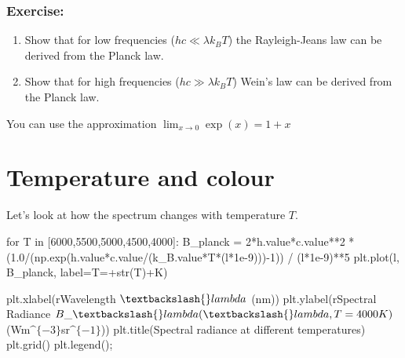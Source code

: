 \documentclass[
  letterpaper,
  DIV=11,
  numbers=noendperiod]{scrreprt}
\newenvironment{Shaded}{\begin{snugshade}}{\end{snugshade}}
\newcommand{\BuiltInTok}[1]{\textcolor[rgb]{0.00,0.23,0.31}{#1}}
\newcommand{\ControlFlowTok}[1]{\textcolor[rgb]{0.00,0.23,0.31}{#1}}
\newcommand{\DecValTok}[1]{\textcolor[rgb]{0.68,0.00,0.00}{#1}}
\newcommand{\FloatTok}[1]{\textcolor[rgb]{0.68,0.00,0.00}{#1}}
\newcommand{\KeywordTok}[1]{\textcolor[rgb]{0.00,0.23,0.31}{#1}}
\newcommand{\NormalTok}[1]{\textcolor[rgb]{0.00,0.23,0.31}{#1}}
\newcommand{\OperatorTok}[1]{\textcolor[rgb]{0.37,0.37,0.37}{#1}}
\newcommand{\StringTok}[1]{\textcolor[rgb]{0.13,0.47,0.30}{#1}}
\newcommand{\VerbatimStringTok}[1]{\textcolor[rgb]{0.13,0.47,0.30}{#1}}
\providecommand{\tightlist}{%
  \setlength{\itemsep}{0pt}\setlength{\parskip}{0pt}}\usepackage{longtable,booktabs,array}
\begin{document}
\hypertarget{exercise}{%
\subsection{Exercise:}\label{exercise}}

\begin{enumerate}
\def\labelenumi{\arabic{enumi}.}
\tightlist
\item
  Show that for low frequencies (\(hc \ll \lambda k_B T\)) the
  Rayleigh-Jeans law can be derived from the Planck law.
\item
  Show that for high frequencies (\(hc \gg \lambda k_B T\)) Wein's law
  can be derived from the Planck law.
\end{enumerate}

You can use the approximation \(\lim_{x\rightarrow 0} \exp(x) = 1 + x\)


\hypertarget{temperature-and-colour}{%
\chapter{Temperature and colour}\label{temperature-and-colour}}

Let's look at how the spectrum changes with temperature \(T\).

\begin{Shaded}
\begin{Highlighting}[]
\ControlFlowTok{for}\NormalTok{ T }\KeywordTok{in}\NormalTok{ [}\DecValTok{6000}\NormalTok{,}\DecValTok{5500}\NormalTok{,}\DecValTok{5000}\NormalTok{,}\DecValTok{4500}\NormalTok{,}\DecValTok{4000}\NormalTok{]:}
\NormalTok{    B\_planck }\OperatorTok{=} \DecValTok{2}\OperatorTok{*}\NormalTok{h.value}\OperatorTok{*}\NormalTok{c.value}\OperatorTok{**}\DecValTok{2} \OperatorTok{*}\NormalTok{ (}\FloatTok{1.0}\OperatorTok{/}\NormalTok{(np.exp(h.value}\OperatorTok{*}\NormalTok{c.value}\OperatorTok{/}\NormalTok{(k\_B.value}\OperatorTok{*}\NormalTok{T}\OperatorTok{*}\NormalTok{(l}\OperatorTok{*}\FloatTok{1e{-}9}\NormalTok{)))}\OperatorTok{{-}}\DecValTok{1}\NormalTok{)) }\OperatorTok{/}\NormalTok{ (l}\OperatorTok{*}\FloatTok{1e{-}9}\NormalTok{)}\OperatorTok{**}\DecValTok{5}
\NormalTok{    plt.plot(l, B\_planck, label}\OperatorTok{=}\StringTok{\textquotesingle{}T=\textquotesingle{}}\OperatorTok{+}\BuiltInTok{str}\NormalTok{(T)}\OperatorTok{+}\StringTok{\textquotesingle{}K\textquotesingle{}}\NormalTok{)}

\NormalTok{plt.xlabel(}\VerbatimStringTok{r\textquotesingle{}Wavelength $\textbackslash{}lambda$ (nm)\textquotesingle{}}\NormalTok{)}
\NormalTok{plt.ylabel(}\VerbatimStringTok{r\textquotesingle{}Spectral Radiance $B\_\textbackslash{}lambda(\textbackslash{}lambda, T=4000K)$ (Wm$\^{}\{{-}3\}$sr$\^{}\{{-}1\}$)\textquotesingle{}}\NormalTok{)}
\NormalTok{plt.title(}\StringTok{\textquotesingle{}Spectral radiance at different temperatures\textquotesingle{}}\NormalTok{)}
\NormalTok{plt.grid()}
\NormalTok{plt.legend()}\OperatorTok{;}
\end{Highlighting}
\end{Shaded}
\end{document}

